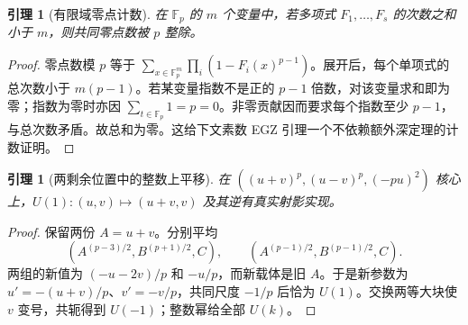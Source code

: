 \documentclass[11pt,a4paper]{article}
\newcommand{\FF}{\mathbb F}
\newtheorem{lemma}[theorem]{引理}
\theoremstyle{definition}
\numberwithin{equation}{section}
\begin{document}
\begin{lemma}[有限域零点计数]
在 $\FF_p$ 的 $m$ 个变量中，若多项式 $F_1,\ldots,F_s$ 的次数之和小于 $m$，则共同零点数被 $p$ 整除。
\end{lemma}
\begin{proof}
零点数模 $p$ 等于 $\sum_{x\in\FF_p^m}\prod_i(1-F_i(x)^{p-1})$。展开后，每个单项式的总次数小于 $m(p-1)$。若某变量指数不是正的 $p-1$ 倍数，对该变量求和即为零；指数为零时亦因 $\sum_{t\in\FF_p}1=p=0$。非零贡献因而要求每个指数至少 $p-1$，与总次数矛盾。故总和为零。这给下文素数 EGZ 引理一个不依赖额外深定理的计数证明。
\end{proof}

\begin{lemma}[两剩余位置中的整数上平移]
在 $((u+v)^p,(u-v)^p,(-pu)^2)$ 核心上，$U(1):(u,v)\mapsto(u+v,v)$ 及其逆有真实射影实现。
\end{lemma}
\begin{proof}
保留两份 $A=u+v$。分别平均
\[
(A^{(p-3)/2},B^{(p+1)/2},C),\qquad
(A^{(p-1)/2},B^{(p-1)/2},C).
\]
两组的新值为 $(-u-2v)/p$ 和 $-u/p$，而新载体是旧 $A$。于是新参数为 $u'=-(u+v)/p$、$v'=-v/p$，共同尺度 $-1/p$ 后恰为 $U(1)$。交换两等大块使 $v$ 变号，共轭得到 $U(-1)$；整数幂给全部 $U(k)$。
\end{proof}

\end{document}
